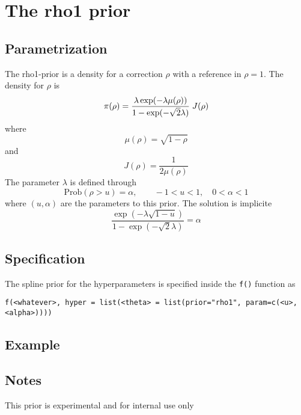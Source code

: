\documentclass[a4paper,11pt]{article}
\begin{document}
\section*{The rho1 prior}

\subsection*{Parametrization}
The rho1-prior is a density for a correction $\rho$ with a reference
in $\rho=1$. The density for $\rho$ is
\begin{displaymath}
    \pi(\rho) = \frac{\lambda \exp(-\lambda \mu(\rho))}{%
        1-\exp(-\sqrt{2}\lambda)} \; J(\rho)
\end{displaymath}
where
\begin{displaymath}
    \mu(\rho) = \sqrt{1-\rho}
\end{displaymath}
and
\begin{displaymath}
    J(\rho) = \frac{1}{2\mu(\rho)}
\end{displaymath}
The parameter $\lambda$ is defined through
\begin{displaymath}
    \text{Prob}( \rho > u) = \alpha, \qquad -1 < u < 1, \quad 0<\alpha<1
\end{displaymath}
where $(u, \alpha{})$ are the parameters to this prior. The solution
is implicite
\begin{displaymath}
    \frac{\exp(-\lambda \sqrt{1-u})}{1-\exp(-\sqrt{2}\lambda)} = \alpha
\end{displaymath}

\subsection*{Specification}
The spline prior for the hyperparameters is specified inside the
{\tt f()} function as 
\begin{center}
    {\tt f(<whatever>, hyper = list(<theta> =
        list(prior="rho1", param=c(<u>,<alpha>))))}
\end{center}

\subsection*{Example}

\subsection*{Notes}
This prior is experimental and for internal use only
\end{document}
